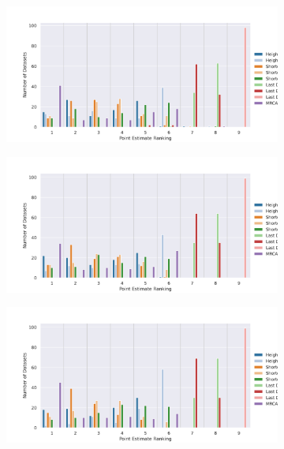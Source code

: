 \documentclass[10pt,letterpaper]{article}
\begin{document}
\begin{figure}[h!]
	\caption{How often each method ranked at a certain position when compared to the other methods. For example, MRCA ranked first for the majority of datasets. (The lower the rank the better.)}
	
	\centering
	\begin{subfigure}[b]{0.45\textwidth}
		\centering
		\includegraphics[width=\textwidth]{figures/yule-100-ccd1-point-estimates-ranking.png}
	\end{subfigure}
	\begin{subfigure}[b]{0.45\textwidth}
		\centering
		\includegraphics[width=\textwidth]{figures/yule-200-ccd1-point-estimates-ranking.png}
	\end{subfigure}
	
	\begin{subfigure}[b]{0.45\textwidth}
		\centering
		\includegraphics[width=\textwidth]{figures/yule-400-ccd1-point-estimates-ranking.png}
	\end{subfigure}
	
	\label{fig:accuracy-point-estimators-ranking}
\end{figure}
\end{document}
